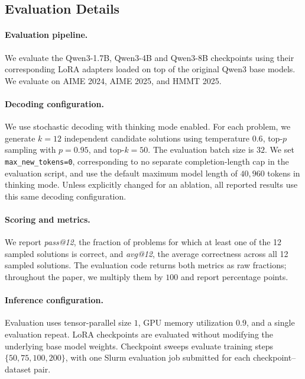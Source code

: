 \subsection{Evaluation Details}
\label{sec:eval_detail}
\paragraph{Evaluation pipeline.}
We evaluate the Qwen3-1.7B, Qwen3-4B and Qwen3-8B checkpoints using their corresponding
LoRA adapters loaded on top of the original Qwen3 base models.
We evaluate on AIME 2024, AIME 2025, and HMMT 2025.

\paragraph{Decoding configuration.}
We use stochastic decoding with thinking mode enabled. For each problem, we generate
$k=12$ independent candidate solutions using temperature $0.6$, top-$p$ sampling with
$p=0.95$, and top-$k=50$. The evaluation batch size is $32$. We set
\texttt{max\_new\_tokens=0}, corresponding to no separate completion-length cap in the
evaluation script, and use the default maximum model length of $40{,}960$ tokens in
thinking mode. Unless explicitly changed for an ablation, all reported results use this
same decoding configuration.

\paragraph{Scoring and metrics.}
We report
\emph{pass@12}, the fraction of problems for which at least one of the 12 sampled
solutions is correct, and \emph{avg@12}, the average correctness across all 12 sampled
solutions. The evaluation code returns both metrics as raw fractions; throughout the paper,
we multiply them by $100$ and report percentage points.

\paragraph{Inference configuration.}
Evaluation uses tensor-parallel size $1$, GPU memory utilization $0.9$, and a single
evaluation repeat. LoRA checkpoints are evaluated without modifying the underlying base
model weights. Checkpoint sweeps evaluate training steps
$\{50,75,100,200\}$, with one Slurm evaluation job submitted for each
checkpoint--dataset pair.

